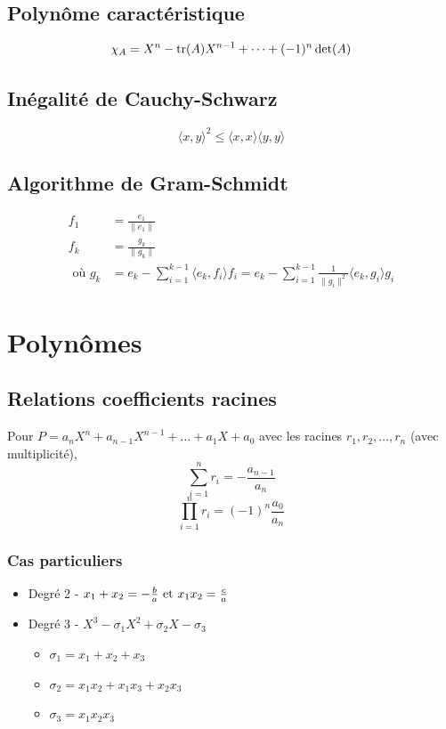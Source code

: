 \documentclass[]{article}
\begin{document}
\subsection*{Polynôme caractéristique}
\[\chi_A = X^n - \text{tr} (A) X^{n-1} + \dots + (-1)^n \det (A)\]

\subsection*{Inégalité de Cauchy-Schwarz}
\[ \langle x, y \rangle ^2 \leq \langle x, x \rangle\langle y, y \rangle \]

\subsection*{Algorithme de Gram-Schmidt}
\begin{align*}
    f_1 &= \frac{e_1}{\|e_1\|} \\
    f_k &= \frac{g_k}{\|g_k\|} \\
    \text{ où } g_k &= e_k - \sum_{i=1}^{k-1} \langle e_k, f_i \rangle f_i = e_k - \sum_{i=1}^{k-1} \frac{1}{\|g_i\|^2} \langle e_k, g_i \rangle g_i
\end{align*}

\section{Polynômes}
\subsection*{Relations coefficients racines}
Pour $P = a_n X^n + a_{n-1} X^{n-1} + \dots + a_1 X + a_0$ avec les racines $r_1, r_2, \dots, r_n$ (avec multiplicité), 
\[ \sum_{i=1}^{n} r_i = -\frac{a_{n-1}}{a_n} \]
\[ \prod_{i=1}^{n} r_i = (-1)^n \frac{a_0}{a_n} \]

\subsubsection*{Cas particuliers}
\begin{itemize}
    \item Degré 2 - $x_1 + x_2 = -\frac{b}{a} \text{ et } x_1x_2 = \frac{c}{a}$
    \item Degré 3 - $X^3 - \sigma_1 X^2 + \sigma_2 X - \sigma_3$
    \begin{itemize}
        \item $\sigma_1 = x_1 + x_2 + x_3$
        \item $\sigma_2 = x_1x_2 + x_1x_3 + x_2x_3$
        \item $\sigma_3 = x_1 x_2 x_3$
    \end{itemize}
\end{itemize}
\end{document}
